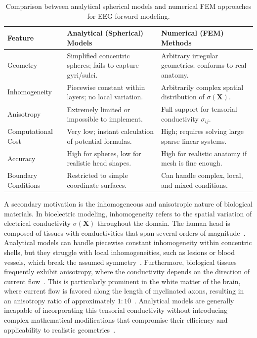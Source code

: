 \begin{table}[htbp]
\centering
\caption[Analytical vs FEM forward models]{Comparison between analytical spherical models and numerical FEM approaches for EEG forward modeling.}
\label{tab:analytical-vs-fem}
\small
\begin{tabularx}{\textwidth}{l X X}
\toprule
\textbf{Feature} 
& \textbf{Analytical (Spherical) Models} 
& \textbf{Numerical (FEM) Methods} \\
\midrule
Geometry            
& Simplified concentric spheres; fails to capture gyri/sulci.
& Arbitrary irregular geometries; conforms to real anatomy. \\
[3pt]
Inhomogeneity       
& Piecewise constant within layers; no local variation.                  
& Arbitrarily complex spatial distribution of $\sigma(\mathbf{X})$. \\
[3pt]
Anisotropy          
& Extremely limited or impossible to implement.
& Full support for tensorial conductivity $\sigma_{ij}$. \\
[3pt]
Computational Cost  
& Very low; instant calculation of potential formulas.
& High; requires solving large sparse linear systems. \\
[3pt]
Accuracy            
& High for spheres, low for realistic head shapes.                           
& High for realistic anatomy if mesh is fine enough. \\
[3pt]
Boundary Conditions 
& Restricted to simple coordinate surfaces.             
& Can handle complex, local, and mixed conditions. \\\bottomrule
\end{tabularx}
\end{table}

A secondary motivation is the inhomogeneous and anisotropic nature of biological materials. In bioelectric modeling, inhomogeneity refers to the spatial variation of electrical conductivity $\sigma(\mathbf{X})$ throughout the domain. The human head is composed of tissues with conductivities that span several orders of magnitude~\cite{chauveau-2003}. Analytical models can handle piecewise constant inhomogeneity within concentric shells, but they struggle with local inhomogeneities, such as lesions or blood vessels, which break the assumed symmetry~\cite{vatta-2010}. Furthermore, biological tissues frequently exhibit anisotropy, where the conductivity depends on the direction of current flow~\cite{hallez-2007, vatta-2010}. This is particularly prominent in the white matter of the brain, where current flow is favored along the length of myelinated axons, resulting in an anisotropy ratio of approximately $1:10$~\cite{lee-2009}. Analytical models are generally incapable of incorporating this tensorial conductivity without introducing complex mathematical modifications that compromise their efficiency and applicability to realistic geometries~\cite{hallez-2007}.

